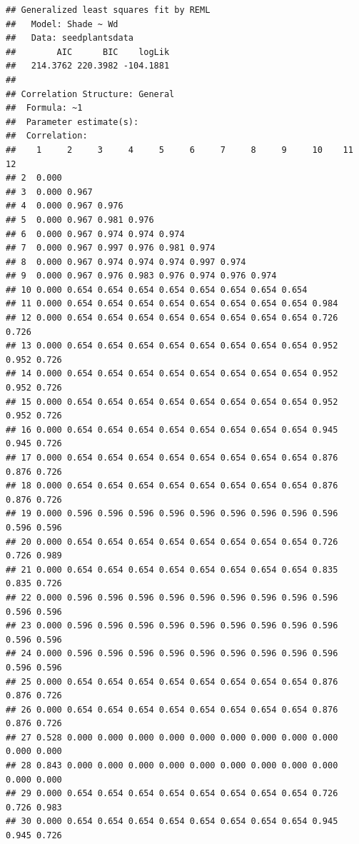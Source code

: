 \documentclass[
]{book}
\begin{document}
\begin{verbatim}
## Generalized least squares fit by REML
##   Model: Shade ~ Wd 
##   Data: seedplantsdata 
##        AIC      BIC    logLik
##   214.3762 220.3982 -104.1881
## 
## Correlation Structure: General
##  Formula: ~1 
##  Parameter estimate(s):
##  Correlation: 
##    1     2     3     4     5     6     7     8     9     10    11    12   
## 2  0.000                                                                  
## 3  0.000 0.967                                                            
## 4  0.000 0.967 0.976                                                      
## 5  0.000 0.967 0.981 0.976                                                
## 6  0.000 0.967 0.974 0.974 0.974                                          
## 7  0.000 0.967 0.997 0.976 0.981 0.974                                    
## 8  0.000 0.967 0.974 0.974 0.974 0.997 0.974                              
## 9  0.000 0.967 0.976 0.983 0.976 0.974 0.976 0.974                        
## 10 0.000 0.654 0.654 0.654 0.654 0.654 0.654 0.654 0.654                  
## 11 0.000 0.654 0.654 0.654 0.654 0.654 0.654 0.654 0.654 0.984            
## 12 0.000 0.654 0.654 0.654 0.654 0.654 0.654 0.654 0.654 0.726 0.726      
## 13 0.000 0.654 0.654 0.654 0.654 0.654 0.654 0.654 0.654 0.952 0.952 0.726
## 14 0.000 0.654 0.654 0.654 0.654 0.654 0.654 0.654 0.654 0.952 0.952 0.726
## 15 0.000 0.654 0.654 0.654 0.654 0.654 0.654 0.654 0.654 0.952 0.952 0.726
## 16 0.000 0.654 0.654 0.654 0.654 0.654 0.654 0.654 0.654 0.945 0.945 0.726
## 17 0.000 0.654 0.654 0.654 0.654 0.654 0.654 0.654 0.654 0.876 0.876 0.726
## 18 0.000 0.654 0.654 0.654 0.654 0.654 0.654 0.654 0.654 0.876 0.876 0.726
## 19 0.000 0.596 0.596 0.596 0.596 0.596 0.596 0.596 0.596 0.596 0.596 0.596
## 20 0.000 0.654 0.654 0.654 0.654 0.654 0.654 0.654 0.654 0.726 0.726 0.989
## 21 0.000 0.654 0.654 0.654 0.654 0.654 0.654 0.654 0.654 0.835 0.835 0.726
## 22 0.000 0.596 0.596 0.596 0.596 0.596 0.596 0.596 0.596 0.596 0.596 0.596
## 23 0.000 0.596 0.596 0.596 0.596 0.596 0.596 0.596 0.596 0.596 0.596 0.596
## 24 0.000 0.596 0.596 0.596 0.596 0.596 0.596 0.596 0.596 0.596 0.596 0.596
## 25 0.000 0.654 0.654 0.654 0.654 0.654 0.654 0.654 0.654 0.876 0.876 0.726
## 26 0.000 0.654 0.654 0.654 0.654 0.654 0.654 0.654 0.654 0.876 0.876 0.726
## 27 0.528 0.000 0.000 0.000 0.000 0.000 0.000 0.000 0.000 0.000 0.000 0.000
## 28 0.843 0.000 0.000 0.000 0.000 0.000 0.000 0.000 0.000 0.000 0.000 0.000
## 29 0.000 0.654 0.654 0.654 0.654 0.654 0.654 0.654 0.654 0.726 0.726 0.983
## 30 0.000 0.654 0.654 0.654 0.654 0.654 0.654 0.654 0.654 0.945 0.945 0.726

\end{verbatim}
\end{document}
